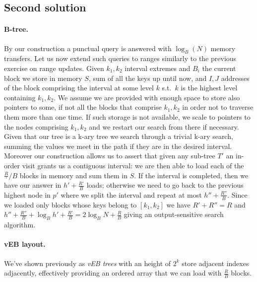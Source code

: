 
\subsection{Second solution}

\paragraph{B-tree.} By our construction a punctual query is answered with $\log_B(N)$ memory transfers.
Let us now extend such queries to ranges similarly to the previous exercise on range updates.
Given $k_1, k_2$ interval extremes and $B_i$ the current block we store in memory $S$, sum of all the keys up until now, and $I, J$ addresses of the block comprising the interval at some level $k$ s.t.\ $k$ is the highest level containing $k_1, k_2$.
We assume we are provided with enough space to store also pointers to some, if not all the blocks that comprise $k_1, k_2$ in order not to traverse them more than one time.
If such storage is not available, we scale to pointers to the nodes comprising $k_1, k_2$ and we restart our search from there if necessary.
Given that our tree is a k-ary tree we search through a trivial k-ary search, summing the values we meet in the path if they are in the desired interval.
Moreover our construction allows us to assert that given any sub-tree $T'$ an in-order visit grants us a contiguous interval: we are then able to load each of the $\frac{R}'/{B}$ blocks in memory and sum them in $S$.
If the interval is completed, then we have our answer in $h' + \frac{R'}{B}$ loads; otherwise we need to go back to the previous highest node in $p'$ where we split the interval and repeat at most $h'' + \frac{R''}{B}$.
Since we loaded only blocks whose keys belong to $[k_1, k_2]$ we have $R' + R'' = R$ and $h'' + \frac{R''}{B} + \log_B{h'} + \frac{R'}{B} = 2\log_B{N} + \frac{R}{B}$ giving an output-sensitive search algorithm.

\paragraph{vEB layout.} We've shown previously as \emph{vEB trees} with an height of $2^k$ store adjacent indexes adjacently, effectively providing an ordered array that we can load with $\frac{R}{B}$ blocks.
